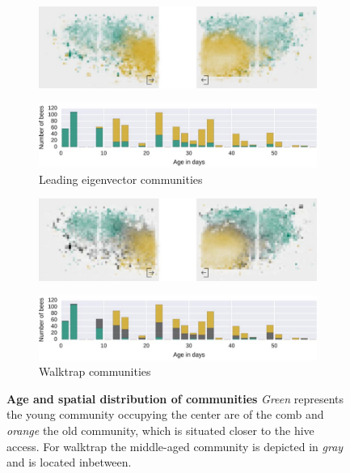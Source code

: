 


\begin{figure}[!htb]
	\centering
	\begin{subfigure}[b]{1.0\textwidth}
	\centering
	\includegraphics[width=1.0\textwidth]{Figures/le_network3}
	\end{subfigure} 
	\begin{subfigure}[b]{1.0\textwidth}
	\centering
	\includegraphics[width=1.0\textwidth]{Figures/n3-ageDistribution-LE}
	\caption[Leading eigenvector communities]{Leading eigenvector communities}
	\label{fig:n3ageLE}
	\end{subfigure}
	\begin{subfigure}[b]{1.0\textwidth}
	\vspace{5mm}
	\centering
	\includegraphics[width=1.0\textwidth]{Figures/wt_network3}
	\end{subfigure}
	\begin{subfigure}[b]{1.0\textwidth}
	\centering
	\includegraphics[width=1.0\textwidth]{Figures/n3-ageDistribution-WT}
	\caption[Walktrap communities]{Walktrap communities}
	\label{fig:n3ageWT}
	\end{subfigure}
	\caption[Age and spatial distribution of communities]{\textbf{Age and spatial distribution of communities} \emph{Green} represents the young community occupying the center are of the comb and \emph{orange} the old community, which is situated closer to the hive access. For walktrap the middle-aged community is depicted in \emph{gray} and is located inbetween.}
	\label{fig:n3-communities}
\end{figure}